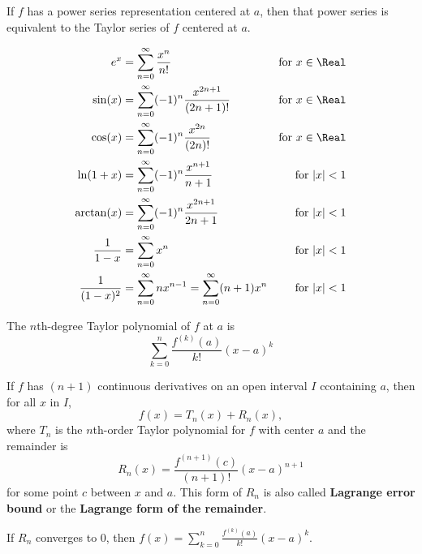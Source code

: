 \begin{theorem}
  If $f$ has a power series representation centered at $a$, then that power series is equivalent to the Taylor series of $f$ centered at $a$.
\end{theorem}

\begin{theorem}
  \begin{align*}
    e^x &= \sum_{n = 0}^\infty \frac{x^n}{n!} & \text{for $x \in \Real$} \\
    \sin(x) &= \sum_{n = 0}^\infty (-1)^n \frac{x^{2n + 1}}{(2n + 1)!} & \text{for $x \in \Real$} \\
    \cos(x) &=\sum_{n = 0}^\infty (-1)^n \frac{x^{2n}}{(2n)!} & \text{for $x \in \Real$} \\
    \ln(1 + x) &= \sum_{n = 0}^\infty (-1)^n \frac{x^{n + 1}}{n + 1} & \text{for $|x| < 1$} \\
    \arctan(x) &= \sum_{n = 0}^\infty (-1)^n \frac{x^{2n + 1}}{2n + 1} & \text{for $|x| < 1$} \\
    \frac{1}{1 - x} &= \sum_{n = 0}^\infty x^n & \text{for $|x| < 1$} \\
    \frac{1}{(1 - x)^2} &= \sum_{n = 0}^\infty nx^{n - 1} = \sum_{n = 0}^\infty (n + 1)x^{n} & \text{for $|x| < 1$} \\
  \end{align*}
\end{theorem}

\begin{definition} The $n$th-degree Taylor polynomial of $f$ at $a$ is
  \[
    \sum_{k = 0}^n \frac{f^{(k)}(a)}{k!} (x-a)^k
  \]
\end{definition}

\begin{theorem} If $f$ has $(n + 1)$ continuous derivatives on an open interval $I$ ccontaining $a$, then for all $x$ in $I$,
  \[
      f(x) = T_n(x) + R_n(x),
  \]
  where $T_n$ is the $n$th-order Taylor polynomial for $f$ with center $a$ and the remainder is
  \[
      R_n(x) = \frac{f^{(n + 1)}(c)}{(n + 1)!}(x - a)^{n + 1}
  \]
  for some point $c$ between $x$ and $a$. This form of $R_n$ is also called \textbf{Lagrange error bound} or the \textbf{Lagrange form of the remainder}.
\end{theorem}

\begin{theorem} If $R_n$ converges to 0, then $f(x) = \sum_{k = 0}^n \frac{f^{(k)}(a)}{k!} (x-a)^k$.
\end{theorem}

